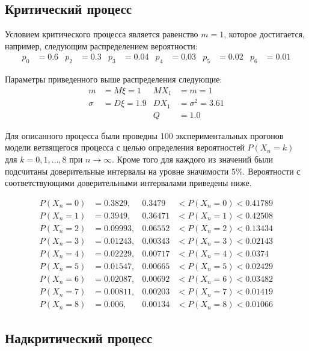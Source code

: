 \subsection*{Критический процесс}

Условием критического процесса является равенство $m = 1$, которое достигается, например, следующим распределением вероятности:
\begin{align*}
    p_0 & = 0.6 & p_2 & = 0.3 & p_3 & = 0.04 & p_4 & = 0.03 & p_5 & = 0.02 & p_6 & = 0.01
\end{align*}

Параметры приведенного выше распределения следующие:
\begin{align*}
    m & = M\xi = 1 & MX_1 & = m = 1\\
    \sigma & = D\xi = 1.9 & DX_1 & = \sigma^2 = 3.61\\
    & & Q & = 1.0
\end{align*}

Для описанного процесса были проведны 100 экспериментальных прогонов модели ветвящегося процесса с целью определения
вероятностей $P(X_n=k)$ для $k=0,1,\dots,8$ при $n\rightarrow\infty$.
Кроме того для каждого из значений были подсчитаны доверительные интервалы на уровне значимости 5\%.
Вероятности с соответствующими доверительными интервалами приведены ниже.

\begin{align*}
P(X_n = 0) & = 0.3829, &  0.3479  & < P(X_n = 0) < 0.41789\\
P(X_n = 1) & = 0.3949, &  0.36471 & < P(X_n = 1) < 0.42508\\
P(X_n = 2) & = 0.09993, &  0.06552 & < P(X_n = 2) < 0.13434\\
P(X_n = 3) & = 0.01243, &  0.00343 & < P(X_n = 3) < 0.02143\\
P(X_n = 4) & = 0.02229, &  0.00717 & < P(X_n = 4) < 0.0374\\
P(X_n = 5) & = 0.01547, &  0.00665 & < P(X_n = 5) < 0.02429\\
P(X_n = 6) & = 0.02087, &  0.00692 & < P(X_n = 6) < 0.03482\\
P(X_n = 7) & = 0.00811, &  0.00203 & < P(X_n = 7) < 0.01419\\
P(X_n = 8) & = 0.006, &  0.00134 & < P(X_n = 8) < 0.01066
\end{align*}

\subsection*{Надкритический процесс}

